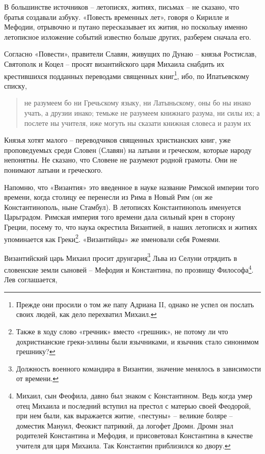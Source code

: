 \documentclass[a5paper,11pt,openany]{article}
\begin{document}
В большинстве источников – летописях, житиях, письмах – не сказано, что братья создавали азбуку. «Повесть временных лет», говоря о Кирилле и Мефодии, отрывочно и путано пересказывает их жития, но поскольку именно летописное изложение событий известно больше других, разберем сначала его.

Согласно «Повести», правители Славян, живущих по Дунаю – князья Ростислав, Святополк и Коцел – просят византийского царя Михаила снабдить их крестившихся подданных переводами священных книг\footnote{Прежде они просили о том же папу Адриана II, однако не успел он послать своих людей, как дело перехватил Михаил.}, ибо, по Ипатьевскому списку,

\begin{quotation}
не разумеем бо ни Гречьскому языку, ни Латыньскому, оны бо ны инако учать, а друзии инако; темьже не разумеем книжнаго разума, ни силы их; а послете ны учителя, иже могуть ны сказати книжная словеса и разум их
\end{quotation}

Князья хотят малого – переводчиков священных христианских книг, уже проповедуемых среди Словен (Славян) на латыни и греческом, которые народу непонятны. Не сказано, что Словене не разумеют родной грамоты. Они не понимают латыни и греческого.

Напомню, что «Византия» это введенное в науке название Римской империи того времени, когда столицу ее перенесли из Рима в Новый Рим (он же Константинополь, ныне Стамбул). В летописях Константинополь именуется Царьградом. Римская империя того времени дала сильный крен в сторону Греции, посему то, что наука окрестила Византией, в наших летописях и житиях упоминается как Греки\footnote{Также в ходу слово «гречник» вместо «грешник», не потому ли что дохристианские греки-эллины были язычниками, и язычник стало синонимом грешнику?}. «Византийцы» же именовали себя Ромеями. 

Византийский царь Михаил просит друнгария\footnote{Должность военного командира в Византии, значение менялось в зависимости от времени.} Льва из Селуни отрядить в словенские земли сыновей – Мефодия и Константина, по прозвищу Философа\footnote{Михаил, сын Феофила, давно был знаком с Константином. Ведь когда умер отец Михаила и последний вступил на престол с матерью своей Феодорой, при нем были, как выражается житие, «пестуны» – великие боляре – доместик Мануил, Феокист патрикий, да логофет Дромн. Дромн знал родителей Константина и Мефодия, и присоветовал Константина в качестве учителя для царя Михаила. Так Константин приблизился ко двору.}. Лев соглашается,
\end{document}
